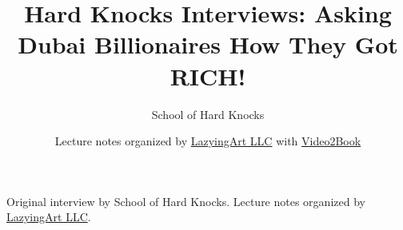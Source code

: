 \documentclass[11pt,oneside]{book}
\begin{document}
\frontmatter
\title{Hard Knocks Interviews: Asking Dubai Billionaires How They Got RICH!}
\author{School of Hard Knocks}
\date{Lecture notes organized by \href{https://lazying.art}{LazyingArt LLC} with \href{https://github.com/lachlanchen/Video2Book}{Video2Book}}
\maketitle
\begin{center}
\small Original interview by School of Hard Knocks. Lecture notes organized by \href{https://lazying.art}{LazyingArt LLC}.
\end{center}
\clearpage
\mainmatter

\end{document}
